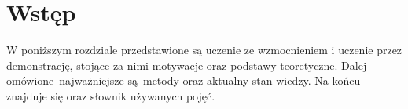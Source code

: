 \section{Wstęp}
W poniższym rozdziale przedstawione są uczenie ze wzmocnieniem i uczenie przez demonstrację, stojące za nimi motywacje oraz podstawy teoretyczne. Dalej omówione najważniejsze są metody oraz aktualny stan wiedzy. Na końcu znajduje się oraz słownik używanych pojęć.
